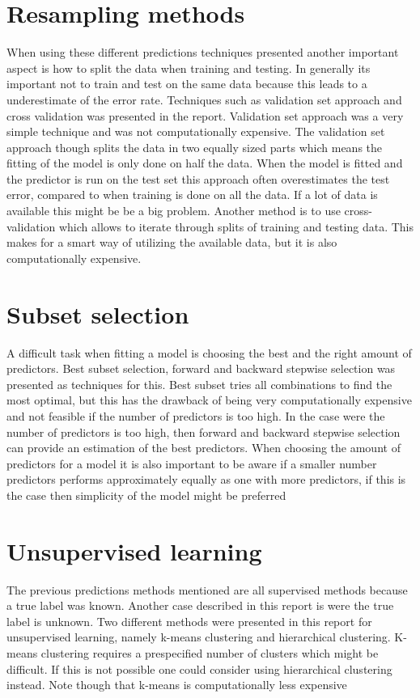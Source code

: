 \section{Resampling methods}
When using these different predictions techniques presented another important aspect is how to split the data when training and testing. In generally its important not to train and test on the same data because this leads to a underestimate of the error rate. Techniques such as validation set approach and cross validation was presented in the report. Validation set approach was a very simple technique and was not computationally expensive. The validation set approach though splits the data in two equally sized parts which means the fitting of the model is only done on half the data. When the model is fitted and the predictor is run on the test set this approach often overestimates the test error, compared to when training is done on all the data. If a lot of data is available this might be be a big problem. Another method is to use cross-validation which allows to iterate through splits of training and testing data. This makes for a smart way of utilizing the available data, but it is also computationally expensive.


\section{Subset selection}
A difficult task when fitting a model is choosing the best and the right amount of predictors. Best subset selection, forward and backward stepwise selection was presented as techniques for this. Best subset tries all combinations to find the most optimal, but this has the drawback of being very computationally expensive and not feasible if the number of predictors is too high. In the case were the number of predictors is too high, then forward and backward stepwise selection can provide an estimation of the best predictors. When choosing the amount of predictors for a model it is also important to be aware if a smaller number predictors performs approximately equally as one with more predictors, if this is the case then simplicity of the model might be preferred

\section{Unsupervised learning}
The previous predictions methods mentioned are all supervised methods because a true label was known. Another case described in this report is were the true label is unknown. Two different methods were presented in this report for unsupervised learning, namely k-means clustering and hierarchical clustering. K-means clustering requires a prespecified number of clusters which might be difficult. If this is not possible one could consider using hierarchical clustering instead. Note though that k-means is computationally less expensive


